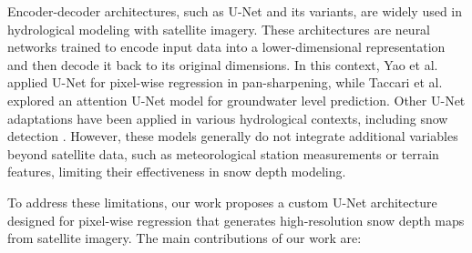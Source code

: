 \documentclass[preprint,12pt]{elsarticle}
\begin{document}
Encoder-decoder architectures, such as U-Net \cite{ronneberger2015u} and its variants, are widely used in hydrological modeling with satellite imagery. These architectures are neural networks trained to encode input data into a lower-dimensional representation and then decode it back to its original dimensions. In this context, Yao et al. \cite{YAO2018} applied U-Net for pixel-wise regression in pan-sharpening, while Taccari et al. \cite{TACCARI2022} explored an attention U-Net model for groundwater level prediction. %
Other U-Net adaptations have been applied in various hydrological contexts, including snow detection \cite{Yin2022, Wang2022, Ma2023}. However, these models generally do not integrate additional variables beyond satellite data, such as meteorological station measurements or terrain features, limiting their effectiveness in snow depth modeling.

To address these limitations, our work proposes a custom U-Net architecture designed for pixel-wise regression that generates high-resolution snow depth maps from satellite imagery. The main contributions of our work are:
\end{document}
